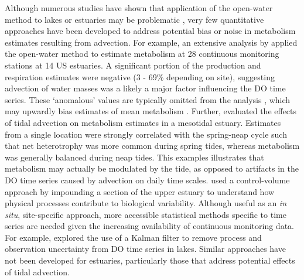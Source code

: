 \documentclass[letterpaper,12pt,oneside]{article}\usepackage[]{graphicx}\usepackage[]{color}
\begin{document}
Although numerous studies have shown that application of the open-water method to lakes or estuaries may be problematic \citep{Ziegler98,Caffrey03,Coloso11,Batt12,Nidzieko14}, very few quantitative approaches have been developed to address potential bias or noise in metabolism estimates resulting from advection.  For example, an extensive analysis by \citet{Caffrey03} applied the open-water method to estimate metabolism at 28 continuous monitoring stations at 14 US estuaries.  A significant portion of the production and respiration estimates were negative (3 - 69\% depending on site), suggesting advection of water masses was a likely a major factor influencing the \ac{DO} time series.  These `anomalous' values are typically omitted from the analysis \citep{Caffrey03,Collins13}, which may upwardly bias estimates of mean metabolism \citep{Caffrey14}.  Further, \citet{Nidzieko14} evaluated the effects of tidal advection on metabolism estimates in a mesotidal estuary.  Estimates from a single location were strongly correlated with the spring-neap cycle such that net heterotrophy was more common during spring tides, whereas metabolism was generally balanced during neap tides.  This examples illustrates that metabolism may actually be modulated by the tide, as opposed to artifacts in the \ac{DO} time series caused by advection on daily time scales.  \citet{Nidzieko14} used a control-volume approach by impounding a section of the upper estuary to understand how physical processes contribute to biological variability.  Although useful as an \textit{in situ}, site-specific approach, more accessible statistical methods specific to time series are needed given the increasing availability of continuous monitoring data. For example, \citet{Batt12} explored the use of a Kalman filter \citep{Harvey89} to remove process and observation uncertainty from \ac{DO} time series in lakes.  Similar approaches have not been developed for estuaries, particularly those that address potential effects of tidal advection.
\end{document}

